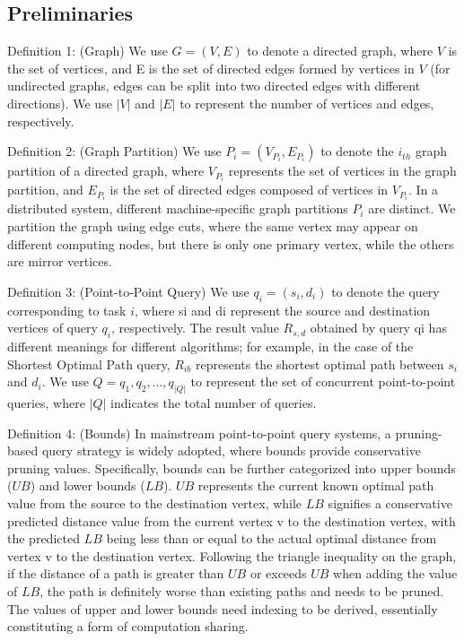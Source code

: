 \documentclass[lettersize,journal]{IEEEtran} %
\begin{document}
\subsection{Preliminaries}
Definition 1: (Graph) We use $G=(V,E)$ to denote a directed graph, where $V$ is the set of vertices, and E is the set of directed edges formed by vertices in $V$ (for undirected graphs, edges can be split into two directed edges with different directions). We use $|V|$ and $|E|$ to represent the number of vertices and edges, respectively.

Definition 2: (Graph Partition) We use $P_i=(V_{P_i},E_{P_i})$ to denote the $i_{th}  $ graph partition of a directed graph, where $V_{P_i}$ represents the set of vertices in the graph partition, and $E_{P_i}$ is the set of directed edges composed of vertices in $V_{P_i}$. In a distributed system, different machine-specific graph partitions $P_i$ are distinct. We partition the graph using edge cuts, where the same vertex may appear on different computing nodes, but there is only one primary vertex, while the others are mirror vertices.

Definition 3: (Point-to-Point Query) We use $q_i=(s_i,d_i)$ to denote the query corresponding to task $i$, where si and di represent the source and destination vertices of query $q_i$, respectively. The result value $R_{s,d}$ obtained by query qi has different meanings for different algorithms; for example, in the case of the Shortest Optimal Path query, $R_{ib}$ represents the shortest optimal path between $s_i$ and $d_i$. We use $Q={q_1,q_2,\ldots,q_{|Q|}}$ to represent the set of concurrent point-to-point queries, where $|Q|$ indicates the total number of queries.

Definition 4: (Bounds) In mainstream point-to-point query systems, a pruning-based query strategy is widely adopted, where bounds provide conservative pruning values. Specifically, bounds can be further categorized into upper bounds ($UB$) and lower bounds ($LB$). $UB$ represents the current known optimal path value from the source to the destination vertex, while $LB$ signifies a conservative predicted distance value from the current vertex v to the destination vertex, with the predicted $LB$ being less than or equal to the actual optimal distance from vertex v to the destination vertex. Following the triangle inequality on the graph, if the distance of a path is greater than $UB$ or exceeds $UB$ when adding the value of $LB$, the path is definitely worse than existing paths and needs to be pruned. The values of upper and lower bounds need indexing to be derived, essentially constituting a form of computation sharing.
\end{document}
